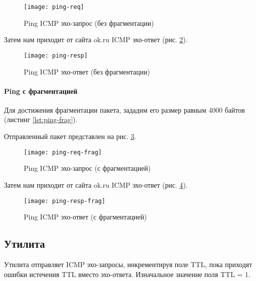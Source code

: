 

\begin{figure}[H]
	\centering
	\texttt{[image: ping-req]}
	\caption{Ping ICMP эхо-запрос (без фрагментации)}
	\label{fig:ping-req}
\end{figure}

Затем нам приходит от сайта ok.ru ICMP эхо-ответ (рис. \ref{fig:ping-resp}).

\begin{figure}[H]
	\centering
	\texttt{[image: ping-resp]}
	\caption{Ping ICMP эхо-ответ (без фрагментации)}
	\label{fig:ping-resp}
\end{figure}

\newpage

\paragraph{Ping с фрагментацией}

Для достижения фрагментации пакета, зададим его размер равным 4000 байтов (листинг \ref{lst:ping-frag}).



Отправленный пакет представлен на рис. \ref{fig:ping-req-frag}.

\begin{figure}[H]
	\centering
	\texttt{[image: ping-req-frag]}
	\caption{Ping ICMP эхо-запрос (с фрагментацией)}
	\label{fig:ping-req-frag}
\end{figure}

Затем нам приходит от сайта ok.ru ICMP эхо-ответ (рис. \ref{fig:ping-resp-frag}).

\begin{figure}[H]
	\centering
	\texttt{[image: ping-resp-frag]}
	\caption{Ping ICMP эхо-ответ (с фрагментацией)}
	\label{fig:ping-resp-frag}
\end{figure}

\subsection{Утилита }

Утилита  отправляет ICMP эхо-запросы, инкрементируя поле TTL, пока приходят ошибки истечения TTL вместо эхо-ответа. Изначальное значение поля TTL = 1.

